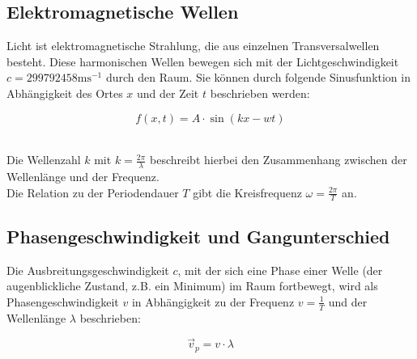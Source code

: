 \documentclass[12pt,a4paper,titlepage,headinclude,bibtotoc]{scrartcl}
\begin{document}
\subsection{Elektromagnetische Wellen}
Licht ist elektromagnetische Strahlung, die aus einzelnen Transversalwellen besteht. Diese harmonischen Wellen bewegen sich mit der Lichtgeschwindigkeit $c= 299 792 458\mathrm{ms^{-1}}$ durch den Raum. Sie können durch folgende Sinusfunktion in Abhängigkeit des Ortes $x$ und der Zeit $t$ beschrieben werden:
\\
\par %
\begin{equation}
f(x,t)={ A}\cdot{\sin(kx-wt)}
\end{equation}
\\
\par

Die Wellenzahl $k$ mit $k=\frac{2\pi}{\lambda}$ beschreibt hierbei den Zusammenhang zwischen der Wellenlänge und der Frequenz. \\
Die Relation zu der Periodendauer $T$ gibt die Kreisfrequenz $\omega =\frac{2\pi}{T} $ an.  








\subsection{Phasengeschwindigkeit und Gangunterschied}
Die Ausbreitungsgeschwindigkeit $c$, mit der sich eine Phase einer Welle (der augenblickliche Zustand, z.B. ein Minimum) im Raum fortbewegt, wird als Phasengeschwindigkeit $v$ in Abhängigkeit zu der Frequenz $v=\frac{1}{T}$ und der Wellenlänge $\lambda$ beschrieben:\\
\par
\begin{equation}
\vec{v}_p = {v}\cdot{\lambda}
\end{equation}
\\
\par
\end{document}
